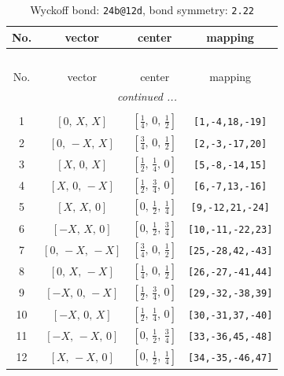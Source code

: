 \documentclass[fleqn,8pt]{jsarticle}
\begin{document}
\begin{longtable}{cccc}
\caption{Wyckoff bond: {\tt 24b@12d}, bond symmetry: {\tt 2.22}}
 \\
 \hline \hline
No. & vector & center & mapping \\ \hline \endfirsthead

\multicolumn{3}{l}{\tablename\ \thetable{}} \\
 \hline \hline
No. & vector & center & mapping \\ \hline \endhead

 \hline \hline
\multicolumn{3}{r}{\footnotesize\it continued ...} \\ \endfoot

 \hline \hline
\multicolumn{3}{r}{} \\ \endlastfoot

1 & $\left[ 0,\, X,\, X \right]$ & $\left[ \frac{1}{4},\, 0,\, \frac{1}{2} \right]$ & {\tt [1,-4,18,-19]} \\ \hline
2 & $\left[ 0,\, - X,\, X \right]$ & $\left[ \frac{3}{4},\, 0,\, \frac{1}{2} \right]$ & {\tt [2,-3,-17,20]} \\ \hline
3 & $\left[ X,\, 0,\, X \right]$ & $\left[ \frac{1}{2},\, \frac{1}{4},\, 0 \right]$ & {\tt [5,-8,-14,15]} \\ \hline
4 & $\left[ X,\, 0,\, - X \right]$ & $\left[ \frac{1}{2},\, \frac{3}{4},\, 0 \right]$ & {\tt [6,-7,13,-16]} \\ \hline
5 & $\left[ X,\, X,\, 0 \right]$ & $\left[ 0,\, \frac{1}{2},\, \frac{1}{4} \right]$ & {\tt [9,-12,21,-24]} \\ \hline
6 & $\left[ - X,\, X,\, 0 \right]$ & $\left[ 0,\, \frac{1}{2},\, \frac{3}{4} \right]$ & {\tt [10,-11,-22,23]} \\ \hline
7 & $\left[ 0,\, - X,\, - X \right]$ & $\left[ \frac{3}{4},\, 0,\, \frac{1}{2} \right]$ & {\tt [25,-28,42,-43]} \\ \hline
8 & $\left[ 0,\, X,\, - X \right]$ & $\left[ \frac{1}{4},\, 0,\, \frac{1}{2} \right]$ & {\tt [26,-27,-41,44]} \\ \hline
9 & $\left[ - X,\, 0,\, - X \right]$ & $\left[ \frac{1}{2},\, \frac{3}{4},\, 0 \right]$ & {\tt [29,-32,-38,39]} \\ \hline
10 & $\left[ - X,\, 0,\, X \right]$ & $\left[ \frac{1}{2},\, \frac{1}{4},\, 0 \right]$ & {\tt [30,-31,37,-40]} \\ \hline
11 & $\left[ - X,\, - X,\, 0 \right]$ & $\left[ 0,\, \frac{1}{2},\, \frac{3}{4} \right]$ & {\tt [33,-36,45,-48]} \\ \hline
12 & $\left[ X,\, - X,\, 0 \right]$ & $\left[ 0,\, \frac{1}{2},\, \frac{1}{4} \right]$ & {\tt [34,-35,-46,47]} \\
\end{longtable}
\end{document}
